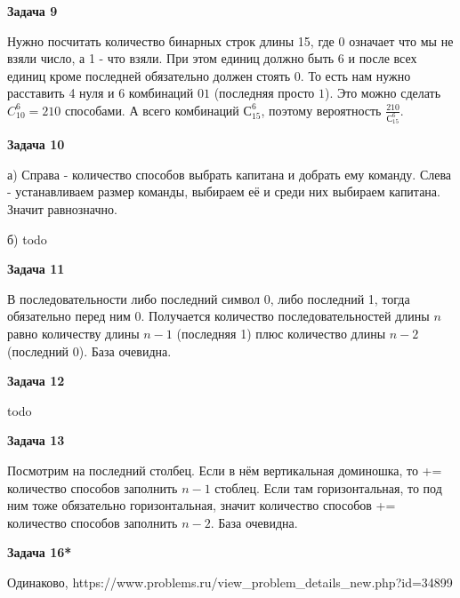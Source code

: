 \begin{center}
\textbf{Задача 9}
\end{center}
Нужно посчитать количество бинарных строк длины 15, где $\displaystyle 0$ означает что мы не взяли число, а 1 - что взяли. При этом единиц должно быть 6 и после всех единиц кроме последней обязательно должен стоять 0. То есть нам нужно расставить 4 нуля и 6 комбинаций $\displaystyle 01$ (последняя просто $\displaystyle 1$). Это можно сделать $\displaystyle C_{10}^{6} =210$ способами. А всего комбинаций $\displaystyle С_{15}^{6}$, поэтому вероятность $\displaystyle \frac{210}{С_{15}^{6}}$.

\begin{center}
\textbf{Задача 10}
\end{center}
а) Справа - количество способов выбрать капитана и добрать ему команду. Слева - устанавливаем размер команды, выбираем её и среди них выбираем капитана. Значит равнозначно.

б) todo

\begin{center}
\textbf{Задача 11}
\end{center}
В последовательности либо последний символ 0, либо последний 1, тогда обязательно перед ним 0. Получается количество последовательностей длины $\displaystyle n$ равно количеству длины $\displaystyle n-1$ (последняя 1) плюс количество длины $\displaystyle n-2$ (последний 0). База очевидна.

\begin{center}
\textbf{Задача 12}
\end{center}
todo

\begin{center}
\textbf{Задача 13}
\end{center}
Посмотрим на последний столбец. Если в нём вертикальная доминошка, то += количество способов заполнить $\displaystyle n-1$ стоблец. Если там горизонтальная, то под ним тоже обязательно горизонтальная, значит количество способов += количество способов заполнить $\displaystyle n-2$. База очевидна.

\begin{center}
\textbf{Задача 16*}
\end{center}
Одинаково, https://www.problems.ru/view\_problem\_details\_new.php?id=34899